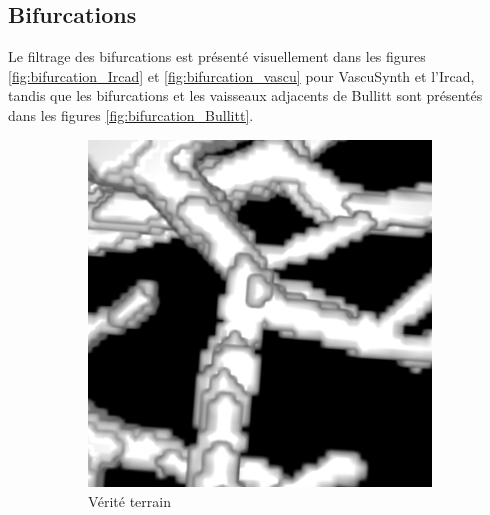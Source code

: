 \subsection{Bifurcations}
Le filtrage des bifurcations est présenté visuellement dans les figures \ref{fig:bifurcation_Ircad} et \ref{fig:bifurcation_vascu} pour VascuSynth et l'Ircad, tandis que les bifurcations et les vaisseaux adjacents de Bullitt sont présentés dans les figures \ref{fig:bifurcation_Bullitt}.
\begin{figure}[!ht]
  \captionsetup[subfigure]{justification=centering}
  \centering
      \begin{subfigure}[t]{0.30\textwidth}
        \includegraphics[clip = true, trim  = 0 50 0 80, width=\textwidth]{Images/Ircad_k_GT.png}
        \caption{Vérité terrain}
      \end{subfigure}
      \begin{subfigure}[t]{0.30\textwidth}

\end{subfigure}
\end{figure}
